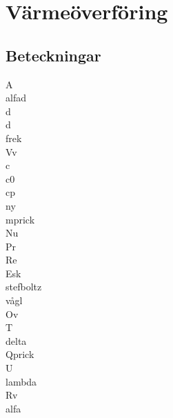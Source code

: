 \chapter{Värmeöverföring}
\section*{Beteckningar}
\acrfull{A}\\
\acrfull{alfad}\\
\acrfull{d}\\
\acrfull{d}\\
\acrfull{frek}\\
\acrfull{Vv}\\
\acrfull{c}\\
\acrfull{c0}\\
\acrfull{cp}\\
\acrfull{ny}\\
\acrfull{mprick}\\
\acrfull{Nu}\\
\acrfull{Pr}\\
\acrfull{Re}\\
\acrfull{Esk}\\
\acrfull{stefboltz}\\
\acrfull{vågl}\\
\acrfull{Ov}\\
\acrfull{T}\\
\acrfull{delta}\\
\acrfull{Qprick}\\
\acrfull{U}\\
\acrfull{lambda}\\
\acrfull{Rv}\\
\acrfull{alfa}

